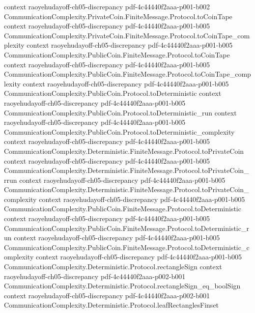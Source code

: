 \begin{lemma}
  {context}
  {raoyehudayoff-ch05-discrepancy}
  {pdf-4c44440f2aaa-p001-b002}
\proofstep
  {CommunicationComplexity.PrivateCoin.FiniteMessage.Protocol.toCoinTape}
  {context}
  {raoyehudayoff-ch05-discrepancy}
  {pdf-4c44440f2aaa-p001-b005}
\proofstep
  {CommunicationComplexity.PrivateCoin.FiniteMessage.Protocol.toCoinTape_complexity}
  {context}
  {raoyehudayoff-ch05-discrepancy}
  {pdf-4c44440f2aaa-p001-b005}
\proofstep
  {CommunicationComplexity.PublicCoin.FiniteMessage.Protocol.toCoinTape}
  {context}
  {raoyehudayoff-ch05-discrepancy}
  {pdf-4c44440f2aaa-p001-b005}
\proofstep
  {CommunicationComplexity.PublicCoin.FiniteMessage.Protocol.toCoinTape_complexity}
  {context}
  {raoyehudayoff-ch05-discrepancy}
  {pdf-4c44440f2aaa-p001-b005}
\proofstep
  {CommunicationComplexity.PublicCoin.Protocol.toDeterministic}
  {context}
  {raoyehudayoff-ch05-discrepancy}
  {pdf-4c44440f2aaa-p001-b005}
\proofstep
  {CommunicationComplexity.PublicCoin.Protocol.toDeterministic_run}
  {context}
  {raoyehudayoff-ch05-discrepancy}
  {pdf-4c44440f2aaa-p001-b005}
\proofstep
  {CommunicationComplexity.PublicCoin.Protocol.toDeterministic_complexity}
  {context}
  {raoyehudayoff-ch05-discrepancy}
  {pdf-4c44440f2aaa-p001-b005}
\proofstep
  {CommunicationComplexity.Deterministic.FiniteMessage.Protocol.toPrivateCoin}
  {context}
  {raoyehudayoff-ch05-discrepancy}
  {pdf-4c44440f2aaa-p001-b005}
\proofstep
  {CommunicationComplexity.Deterministic.FiniteMessage.Protocol.toPrivateCoin_rrun}
  {context}
  {raoyehudayoff-ch05-discrepancy}
  {pdf-4c44440f2aaa-p001-b005}
\proofstep
  {CommunicationComplexity.Deterministic.FiniteMessage.Protocol.toPrivateCoin_complexity}
  {context}
  {raoyehudayoff-ch05-discrepancy}
  {pdf-4c44440f2aaa-p001-b005}
\proofstep
  {CommunicationComplexity.PublicCoin.FiniteMessage.Protocol.toDeterministic}
  {context}
  {raoyehudayoff-ch05-discrepancy}
  {pdf-4c44440f2aaa-p001-b005}
\proofstep
  {CommunicationComplexity.PublicCoin.FiniteMessage.Protocol.toDeterministic_run}
  {context}
  {raoyehudayoff-ch05-discrepancy}
  {pdf-4c44440f2aaa-p001-b005}
\proofstep
  {CommunicationComplexity.PublicCoin.FiniteMessage.Protocol.toDeterministic_complexity}
  {context}
  {raoyehudayoff-ch05-discrepancy}
  {pdf-4c44440f2aaa-p001-b005}
\proofstep
  {CommunicationComplexity.Deterministic.Protocol.rectangleSign}
  {context}
  {raoyehudayoff-ch05-discrepancy}
  {pdf-4c44440f2aaa-p002-b001}
\proofstep
  {CommunicationComplexity.Deterministic.Protocol.rectangleSign_eq_boolSign}
  {context}
  {raoyehudayoff-ch05-discrepancy}
  {pdf-4c44440f2aaa-p002-b001}
\proofstep
  {CommunicationComplexity.Deterministic.Protocol.leafRectanglesFinset}

\end{lemma}
